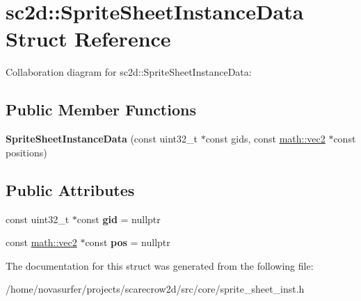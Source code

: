 \hypertarget{structsc2d_1_1SpriteSheetInstanceData}{}\section{sc2d\+:\+:Sprite\+Sheet\+Instance\+Data Struct Reference}
\label{structsc2d_1_1SpriteSheetInstanceData}


Collaboration diagram for sc2d\+:\+:Sprite\+Sheet\+Instance\+Data\+:
\subsection*{Public Member Functions}
\begin{DoxyCompactItemize}
\item 
\mbox{\label{structsc2d_1_1SpriteSheetInstanceData_a2e5e608260c8e1536c947150b9affe88}} 
{\bfseries Sprite\+Sheet\+Instance\+Data} (const uint32\+\_\+t $\ast$const gids, const \hyperlink{structmath_1_1vec2}{math\+::vec2} $\ast$const positions)
\end{DoxyCompactItemize}
\subsection*{Public Attributes}
\begin{DoxyCompactItemize}
\item 
\mbox{\label{structsc2d_1_1SpriteSheetInstanceData_ad635a9c930675ec8287a9b88cb62399c}} 
const uint32\+\_\+t $\ast$const {\bfseries gid} = nullptr
\item 
\mbox{\label{structsc2d_1_1SpriteSheetInstanceData_a69c41cf74f4a5a95e9fc4da5431dfce0}} 
const \hyperlink{structmath_1_1vec2}{math\+::vec2} $\ast$const {\bfseries pos} = nullptr
\end{DoxyCompactItemize}


The documentation for this struct was generated from the following file\+:\begin{DoxyCompactItemize}
\item 
/home/novasurfer/projects/scarecrow2d/src/core/sprite\+\_\+sheet\+\_\+inst.\+h\end{DoxyCompactItemize}
